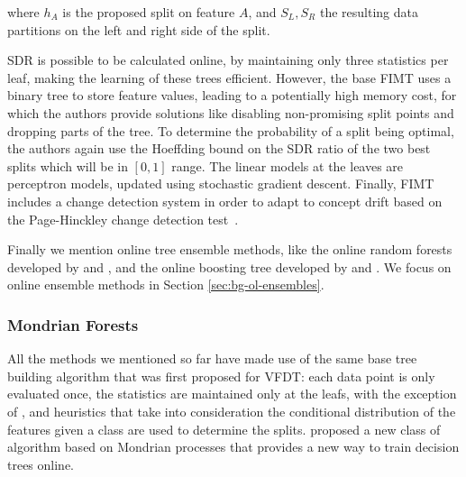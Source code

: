 \noindent
where $h_A$ is the proposed split on feature $A$, and $S_L, S_R$ the resulting
data partitions on the left and right side of the split.

SDR is possible to be calculated online, by maintaining only three statistics per leaf,
making the learning of these trees efficient. However, the base FIMT uses a binary tree
to store feature values, leading to a potentially high memory cost, for which
the authors provide solutions like disabling non-promising split points and dropping
parts of the tree. To determine the
probability of a split being optimal, the authors again use the Hoeffding bound
on the SDR ratio of the two best splits which will be in $[0, 1]$ range.
The linear models at the leaves are perceptron models, updated using stochastic
gradient descent.  Finally, FIMT includes a change detection system in order to
adapt to concept drift
based on the Page-Hinckley change detection test~\cite{ph-test, ph-test2}.

Finally we mention online tree ensemble methods, like the online
random forests developed by \citet{Saffari2009onlineRF} and \citet{Gomes2017},
and the online boosting tree developed by \citet{online-gradient-boosting} and
\citet{online-boost-cv-7}. We focus on online ensemble methods in Section \ref{sec:bg-ol-ensembles}.

\subsubsection*{Mondrian Forests}

All the methods we mentioned so far have made use of the same base tree building
algorithm that was first proposed for VFDT: each data point is only evaluated once,
the statistics are maintained only at the leafs, with the exception of \cite{efdt},
and heuristics that take into consideration the conditional distribution of the
features given a class are used to determine the splits. \citet{mondrian-forests-original}
proposed a new class of algorithm based on Mondrian processes \cite{mondrian-process}
that provides a new way to train decision trees online.


